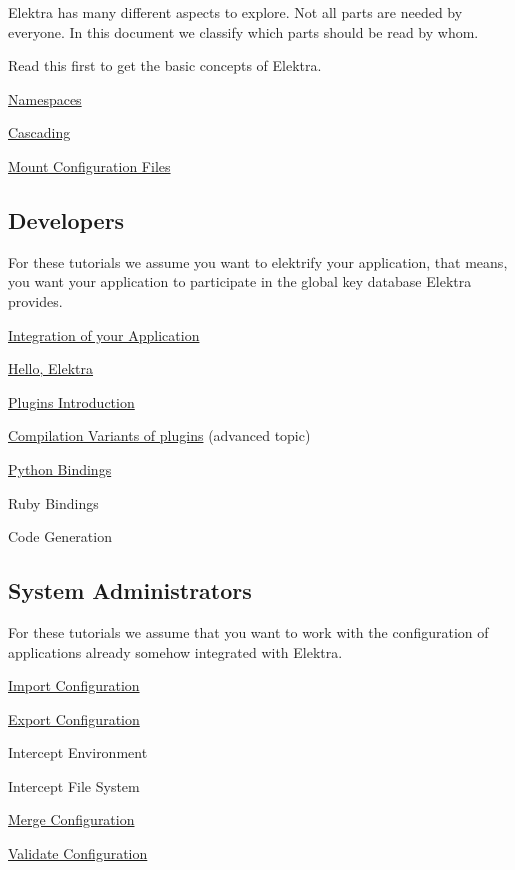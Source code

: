 Elektra has many different aspects to explore. Not all parts are needed by everyone. In this document we classify which parts should be read by whom.

Read this first to get the basic concepts of Elektra.


\begin{DoxyItemize}
\item \hyperlink{doc_tutorials_namespaces_md}{Namespaces}
\item \hyperlink{doc_tutorials_cascading_md}{Cascading}
\item \hyperlink{doc_tutorials_mount_md}{Mount Configuration Files}
\end{DoxyItemize}

\subsection*{Developers}

For these tutorials we assume you want to elektrify your application, that means, you want your application to participate in the global key database Elektra provides.


\begin{DoxyItemize}
\item \hyperlink{doc_tutorials_application-integration_md}{Integration of your Application}
\item \hyperlink{doc_tutorials_hello-elektra_md}{Hello, Elektra}
\item \hyperlink{doc_tutorials_plugins_md}{Plugins Introduction}
\item \hyperlink{doc_tutorials_compilation-variants_md}{Compilation Variants of plugins} (advanced topic)
\item \hyperlink{doc_tutorials_python-kdb_md}{Python Bindings}
\item Ruby Bindings
\item Code Generation
\end{DoxyItemize}

\subsection*{System Administrators}

For these tutorials we assume that you want to work with the configuration of applications already somehow integrated with Elektra.


\begin{DoxyItemize}
\item \hyperlink{doc_tutorials_import_md}{Import Configuration}
\item \hyperlink{doc_tutorials_export_md}{Export Configuration}
\item Intercept Environment
\item Intercept File System
\item \hyperlink{doc_tutorials_merge_md}{Merge Configuration}
\item \hyperlink{md_doc_tutorials_validation_doc_tutorials_validation_md}{Validate Configuration}
\end{DoxyItemize}

